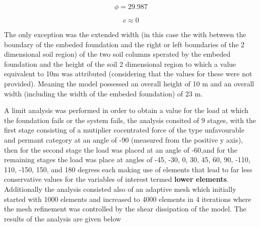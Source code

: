 \documentclass{article}
\begin{document}
\begin{par}
 $$\phi=29.987$$
\end{par}

\begin{par}
$$c\approx0$$
\end{par}
\begin{par}
\begin{flushleft}
The only exception was the extended width (in this case the with  between the boundary of the embeded foundation and the right or left boundaries of the 2 dimensional soil region) of the two soil columns sperated by the embeded foundation and the height of the soil 2 dimensional region to which a value equivalent to 10m was attributed (considering that the values for these were not provided). Meaning the model possessed an overall height of 10 m and an overall width (including the width of the embeded foundation) of 23 m.
\end{flushleft}
\end{par}

\begin{par}
\begin{flushleft}
A limit analysis was performed in order to obtain a value for the load at which the foundation fails or the system fails, the analysis consited of 9 stages, with the first stage consisting of a mutiplier cocentrated force of the type unfavourable and permant category at an angle of -90 (measured from the positive y axis), then for the second stage the load was placed at an angle of -60,and for the remaining stages the load was place at angles of -45, -30, 0, 30, 45, 60, 90, -110, 110, -150, 150, and 180 degress each making use of elements that lead to far less conservative values for the variables of interest termed \textbf{lower elements}. Additionally the analysis consisted also of an adaptive mesh which initially started with 1000 elements and increased to 4000 elements in 4 iterations where the mesh refinement was controlled by the shear dissipation of the model. The results of the analysis are given below 
\end{flushleft}
\end{par}
\end{document}

